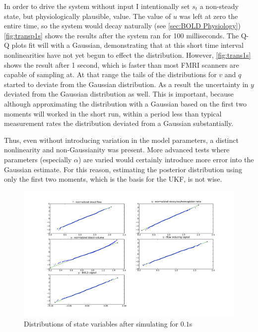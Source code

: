 In order to drive the system without input I intentionally set $s_t$ a non-steady
state, but physiologically plausible, value. The value of $u$ was left at zero 
the entire time, so the 
system would decay naturally (see \autoref{sec:BOLD Physiology})
\autoref{fig:transp1s} shows the results after the
system ran for 100 milliseconds. 
The Q-Q plots fit will with a Gaussian, demonstrating that at this short
time interval nonlinearities have not yet begun to effect the distribution.
However, \autoref{fig:trans1s} shows the result after 1 second, which is faster
than most FMRI scanners are capable of sampling at. At that range the tails 
of the distributions for $v$ and $q$ started to deviate from the
Gaussian distribution. As a result the uncertainty in $y$ deviated from
the Gaussian distribution as well. This is important, because although 
approximating the distribution with a Gaussian based on the first two
moments will worked in the short run, within a period less than typical
measurement rates the distribution deviated from a Gaussian substantially. 

Thus, even without introducing variation in the model parameters,
a distinct nonlinearity and non-Gaussianity was present. 
More advanced tests where parameters (especially $\alpha$) are varied
would certainly introduce more error into the Gaussian estimate. 
For this reason, estimating the posterior distribution using only 
the first two moments, which is the basis for the UKF, is not wise. 

\begin{figure}
\centering
\includegraphics[trim=6cm .75cm 6cm .75cm,width=16cm]{images/gauss_step_point1sec_3sigma.pdf}
\caption{Distributions of state variables after simulating for $0.1$s}
\label{fig:transp1s}
\end{figure}


